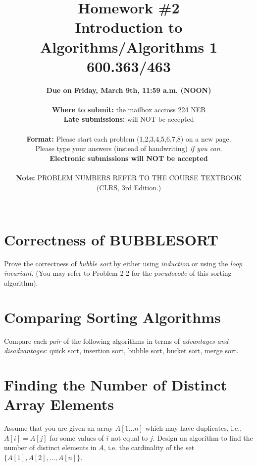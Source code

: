 \documentclass[letterpaper, 11pt]{article}
\begin{document}
\title{Homework \#2 \\ Introduction to Algorithms/Algorithms 1 \\ 600.363/463 }
\author{\textbf{Due on Friday, March 9th, 11:59 a.m. (NOON)}\\
\\\textbf{Where to submit:} the mailbox accross 224 NEB
\\ \textbf{Late submissions:} will NOT be accepted\\
\\ \textbf{Format:} Please start each problem (1,2,3,4,5,6,7,8) on a new page. 
\\ Please type your answers (instead of handwriting) \emph{if you can}.
\\ \textbf{Electronic submissions will NOT be accepted}\\
\\ \textbf{Note:} PROBLEM NUMBERS REFER TO THE COURSE TEXTBOOK\\ (CLRS, 3rd Edition.)\\
\\}

\maketitle


\section{Correctness of BUBBLESORT} %
Prove the correctness of \emph{bubble sort} by either using \emph{induction} or using the \emph{loop invariant}. (You may refer to Problem 2-2 for the \emph{pseudocode} of this sorting algorithm).

\section{Comparing Sorting Algorithms}  %
Compare each \emph{pair} of the following algorithms in terms of \emph{advantages and disadvantages}: quick sort, insertion sort, bubble sort, bucket sort, merge sort.

\eject

\section{Finding the Number of Distinct Array Elements}
Assume that you are given an array $A[1 \dots n]$ which may have duplicates, 
i.e., $A[i]=A[j]$ for some values of $i$ not equal to $j$. 
Design an algorithm to find the number of distinct elements in $A$, 
i.e. the cardinality of the set $\lbrace A[1], A[2], \dotsc ,A[n] \rbrace$.
\end{document}
